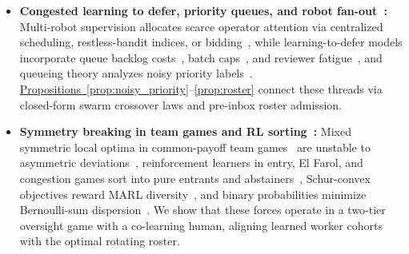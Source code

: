 \documentclass[11pt,reqno]{amsart}
\theoremstyle{spacious}
\newcommand{\Wtxt}[1]{\textcolor{colW}{#1}}
\newcommand{\Htxt}[1]{\textcolor{colH}{#1}}
\begin{document}
\begin{itemize}
  \item \textbf{Congested learning to defer, priority queues, and robot fan-out~\cite{olsen2004fanout,chien2012queues,dahiya2022restless,hoque2023fleet,costen2024shared,argon2009priority,ouyang2022priorities,lykouris2024congested,alves2024deccaf,zhang2026falcon,saketos2026defer,ancker2017alertfatigue}:}
  Multi-robot supervision allocates scarce \Htxt{operator} attention via centralized scheduling, restless-bandit indices, or bidding~\cite{olsen2004fanout,chien2012queues,dahiya2022restless,hoque2023fleet,costen2024shared}, while learning-to-defer models incorporate queue backlog costs~\cite{lykouris2024congested,saketos2026defer}, batch caps~\cite{alves2024deccaf}, and \Htxt{reviewer} fatigue~\cite{zhang2026falcon,ancker2017alertfatigue}, and queueing theory analyzes noisy priority labels~\cite{argon2009priority,ouyang2022priorities}. \hyperref[prop:noisy_priority]{Propositions~\ref{prop:noisy_priority}}--\hyperref[prop:roster]{\ref{prop:roster}} connect these threads via closed-form swarm crossover laws and pre-inbox roster admission.

  \item \textbf{Symmetry breaking in team games and RL sorting~\cite{marschak1972teams,emmons2022symmetric,duffy2005sorting,whitehead2008elfarol,kleinberg2009multiplicative,hoeffding1956successes,amir2026diversity}:}
  Mixed symmetric local optima in common-payoff team games~\cite{marschak1972teams} are unstable to asymmetric deviations~\cite{emmons2022symmetric}, reinforcement learners in entry, El Farol, and congestion games sort into pure entrants and abstainers~\cite{duffy2005sorting,whitehead2008elfarol,kleinberg2009multiplicative}, Schur-convex objectives reward MARL diversity~\cite{amir2026diversity}, and binary probabilities minimize Bernoulli-sum dispersion~\cite{hoeffding1956successes}. We show that these forces operate in a two-tier oversight game with a co-learning \Htxt{human}, aligning learned \Wtxt{worker} cohorts with the optimal rotating roster.
\end{itemize}
\end{document}
